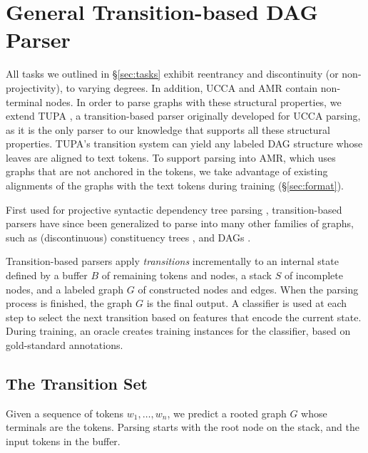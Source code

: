 \documentclass[11pt,a4paper]{article}
\begin{document}
\section{General Transition-based DAG Parser}\label{sec:model}

All tasks we outlined in \S\ref{sec:tasks} exhibit
reentrancy and discontinuity (or non-projectivity), to varying degrees.
In addition, UCCA and AMR contain non-terminal nodes.
In order to parse graphs with these structural properties,
we extend TUPA \cite[henceforth HAR17]{hershcovich2017a}, 
a transition-based parser 
originally developed for UCCA parsing,
as it is the only parser to our knowledge that supports 
all these structural properties.
TUPA's transition system can yield any labeled DAG structure
whose leaves are aligned to text tokens.
To support parsing into AMR, which uses graphs that are not anchored in the tokens,
 we take advantage of existing alignments of the graphs with the text
tokens during training (\S\ref{sec:format}).

First used for projective syntactic dependency tree parsing \cite{Nivre03anefficient},
transition-based parsers have since been generalized to parse into many other
families of graphs, such as (discontinuous) constituency trees \cite[e.g., ][]{zhang2009transition,maier-lichte:2016:DiscoNLP},
and DAGs \cite{sagae2008shift,ribeyre-villemontedelaclergerie-seddah:2014:SemEval,du-EtAl:2015:SemEval}.

Transition-based parsers apply \textit{transitions}
incrementally to an internal state defined by a buffer $B$ of remaining tokens 
and nodes, a stack $S$ of incomplete nodes, and a labeled graph $G$ of 
constructed nodes and edges.
When the parsing process is finished, the graph $G$ is the final output.
A classifier is used at each step to select the next transition based on features
that encode the current state.
During training, an oracle creates training instances for the classifier,
based on gold-standard annotations.




\subsection{The Transition Set}\label{sec:transition_set}

Given a sequence of tokens $w_1, \ldots, w_n$,
we predict a rooted graph $G$ whose terminals are the tokens.
Parsing starts with the root node on the stack,
and the input tokens in the buffer.
\end{document}
